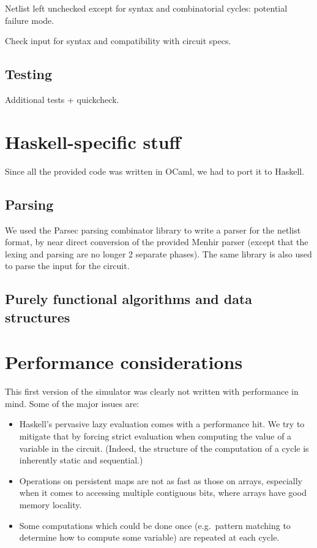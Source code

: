 \documentclass[a4paper, 11pt]{article}
\begin{document}
Netlist left unchecked except for syntax and combinatorial cycles: potential failure mode.

Check input for syntax and compatibility with circuit specs.

\subsection{Testing}

Additional tests + quickcheck.



\section{Haskell-specific stuff}

Since all the provided code was written in OCaml, we had to port it to Haskell.

\subsection{Parsing}

We used the Parsec parsing combinator library to write a parser for the netlist format, by near direct conversion of the provided Menhir parser (except that the lexing and parsing are no longer 2 separate phases). The same library is also used to parse the input for the circuit.

\subsection{Purely functional algorithms and data structures}




\section{Performance considerations}

This first version of the simulator was clearly not written with performance in mind. Some of the major issues are:
\begin{itemize}
\item Haskell's pervasive lazy evaluation comes with a performance hit. We try to mitigate that by forcing strict evaluation when computing the value of a variable in the circuit. (Indeed, the structure of the computation of a cycle is inherently static and sequential.)
\item Operations on persistent maps are not as fast as those on arrays, especially when it comes to accessing multiple contiguous bits, where arrays have good memory locality.
\item Some computations which could be done once (e.g.\ pattern matching to determine how to compute some variable) are repeated at each cycle.
\end{itemize}
\end{document}
